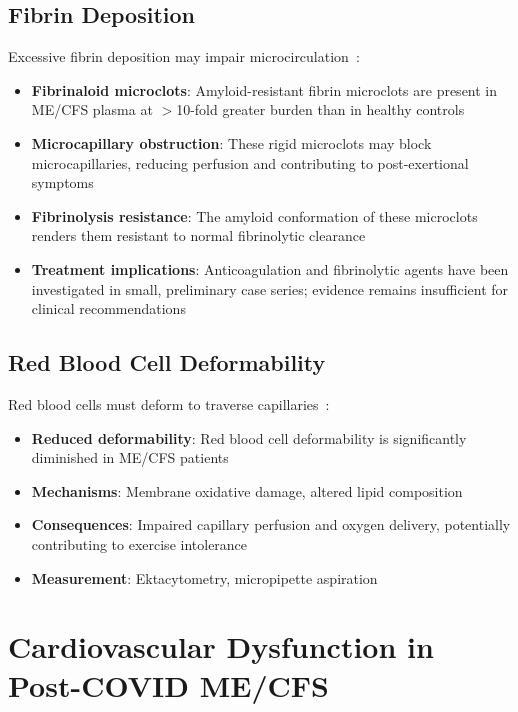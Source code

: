 \subsection{Fibrin Deposition}
\label{sec:fibrin}

Excessive fibrin deposition may impair microcirculation~\cite{Nunes2022microclots}:

\begin{itemize}
    \item \textbf{Fibrinaloid microclots}: Amyloid-resistant fibrin microclots are present in ME/CFS plasma at $>$10-fold greater burden than in healthy controls~\cite{Nunes2022microclots}
    \item \textbf{Microcapillary obstruction}: These rigid microclots may block microcapillaries, reducing perfusion and contributing to post-exertional symptoms~\cite{Nunes2022microclots}
    \item \textbf{Fibrinolysis resistance}: The amyloid conformation of these microclots renders them resistant to normal fibrinolytic clearance~\cite{Nunes2022microclots}
    \item \textbf{Treatment implications}: Anticoagulation and fibrinolytic agents have been investigated in small, preliminary case series; evidence remains insufficient for clinical recommendations
\end{itemize}

\subsection{Red Blood Cell Deformability}
\label{sec:rbc-deformability}

Red blood cells must deform to traverse capillaries~\cite{Saha2019}:

\begin{itemize}
    \item \textbf{Reduced deformability}: Red blood cell deformability is significantly diminished in ME/CFS patients~\cite{Saha2019}
    \item \textbf{Mechanisms}: Membrane oxidative damage, altered lipid composition
    \item \textbf{Consequences}: Impaired capillary perfusion and oxygen delivery, potentially contributing to exercise intolerance~\cite{Saha2019}
    \item \textbf{Measurement}: Ektacytometry, micropipette aspiration
\end{itemize}

\section{Cardiovascular Dysfunction in Post-COVID ME/CFS}
\label{sec:post-covid-cardiovascular}

